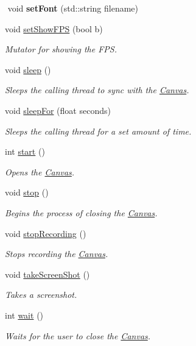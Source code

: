 \begin{DoxyCompactItemize}
$$\mbox{\label{classtsgl_1_1_canvas_a692edf8e37c7714cdf2a58ea530c63e9}} 
void {\bfseries set\+Font} (std\+::string filename)
\item 
void \hyperlink{classtsgl_1_1_canvas_a8722c579dfa55a45e139bfeb269d73ff}{set\+Show\+F\+PS} (bool b)
\begin{DoxyCompactList}\small\item\em Mutator for showing the F\+PS. \end{DoxyCompactList}\item 
void \hyperlink{classtsgl_1_1_canvas_a2604fa056d4541f918ccf447eda1f3cf}{sleep} ()
\begin{DoxyCompactList}\small\item\em Sleeps the calling thread to sync with the \hyperlink{classtsgl_1_1_canvas}{Canvas}. \end{DoxyCompactList}\item 
void \hyperlink{classtsgl_1_1_canvas_a6674cc86b9a54b6a564021fddce47e36}{sleep\+For} (float seconds)
\begin{DoxyCompactList}\small\item\em Sleeps the calling thread for a set amount of time. \end{DoxyCompactList}\item 
int \hyperlink{classtsgl_1_1_canvas_a654315f9b08a9b3b072eebf4b4d8ae89}{start} ()
\begin{DoxyCompactList}\small\item\em Opens the \hyperlink{classtsgl_1_1_canvas}{Canvas}. \end{DoxyCompactList}\item 
void \hyperlink{classtsgl_1_1_canvas_a46cd37a9f2a146e57b4e0273faf6485c}{stop} ()
\begin{DoxyCompactList}\small\item\em Begins the process of closing the \hyperlink{classtsgl_1_1_canvas}{Canvas}. \end{DoxyCompactList}\item 
void \hyperlink{classtsgl_1_1_canvas_ac6035d87aa3bf077031bc0bb6f419b17}{stop\+Recording} ()
\begin{DoxyCompactList}\small\item\em Stops recording the \hyperlink{classtsgl_1_1_canvas}{Canvas}. \end{DoxyCompactList}\item 
void \hyperlink{classtsgl_1_1_canvas_ac035f43763b198f6915a0772973a5ea9}{take\+Screen\+Shot} ()
\begin{DoxyCompactList}\small\item\em Takes a screenshot. \end{DoxyCompactList}\item 
int \hyperlink{classtsgl_1_1_canvas_a39e69fd4d1ad8cf0e22ecea12f1ddf08}{wait} ()
\begin{DoxyCompactList}\small\item\em Waits for the user to close the \hyperlink{classtsgl_1_1_canvas}{Canvas}. \end{DoxyCompactList}\end{DoxyCompactItemize}
